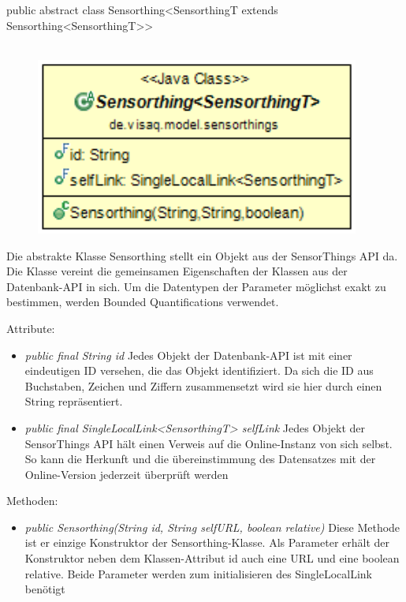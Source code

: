 public abstract class Sensorthing<SensorthingT extends Sensorthing<SensorthingT>>
\\\\
\begin{minipage}{0.4\textwidth}
    \begin{figure}[H]
        {\centering\includegraphics[width=0.95\textwidth]{media/backend/modell/classes/Sensorthing.png}}
    \end{figure}
    \end{minipage} \hfill
    \begin{minipage}{0.6\textwidth}
Die abstrakte Klasse Sensorthing stellt ein Objekt aus der \gls{SensorThings API} da.
Die Klasse vereint die gemeinsamen Eigenschaften der Klassen aus der Datenbank-\gls{API} in sich.
Um die Datentypen der Parameter möglichst exakt zu bestimmen, werden \glspl{Bounded Quantification} verwendet.
\end{minipage}

Attribute:
\begin{itemize}
    \item \emph{public final String id} Jedes Objekt der Datenbank-\gls{API} ist mit einer eindeutigen ID versehen, die das Objekt identifiziert.
    Da sich die ID aus Buchstaben, Zeichen und Ziffern zusammensetzt wird sie hier durch einen String repräsentiert.
    \item \emph{public final SingleLocalLink<SensorthingT> selfLink} Jedes Objekt der \gls{SensorThings API} hält einen Verweis auf die Online-Instanz von sich selbst.
    So kann die Herkunft und die übereinstimmung des Datensatzes mit der Online-Version jederzeit überprüft werden
\end{itemize}
Methoden: \begin{itemize}
    \item \emph{public Sensorthing(String id, String selfURL, boolean relative)} Diese Methode ist er einzige Konstruktor der Sensorthing-Klasse.
    Als Parameter erhält der Konstruktor neben dem Klassen-Attribut id auch eine URL und eine boolean relative. Beide Parameter werden zum initialisieren des SingleLocalLink benötigt
\end{itemize}

